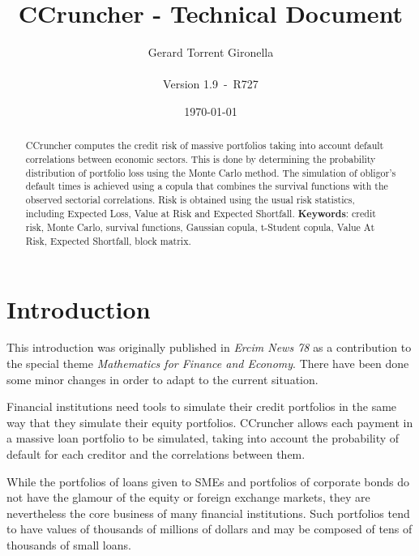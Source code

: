 \documentclass[a4paper,12pt,final]{article}
\def\numversion{1.9}
\def\svnversion{R727}
\begin{document}
\title{CCruncher - Technical Document}
\author{Gerard Torrent Gironella\\\\Version \numversion\ -\ \svnversion}
\date{\today}
\maketitle


\begin{abstract}
CCruncher computes the credit risk of massive portfolios 
taking into account default correlations between economic sectors. This is done 
by determining the probability distribution of portfolio loss using the Monte 
Carlo method. The simulation of obligor's default times is achieved
using a copula that combines the survival functions with the observed
sectorial correlations. Risk is obtained using the usual risk statistics, 
including Expected Loss, Value at Risk and Expected Shortfall.
\newline
\newline
\textbf{Keywords}: credit risk, Monte Carlo, survival functions, Gaussian copula, 
t-Student copula, Value At Risk, Expected Shortfall, block matrix.
\end{abstract}
\newpage


\tableofcontents
\newpage


\section{Introduction}

This introduction was originally published in \emph{Ercim News 78} \cite{ccruncher:ercim78}
as a contribution to the special theme \emph{Mathematics for Finance and Economy}.
There have been done some minor changes in order to adapt to the current situation.
\newline

Financial institutions need tools to simulate their credit portfolios in the same 
way that they simulate their equity portfolios. CCruncher allows each payment
in a massive loan portfolio to be simulated, taking into account the probability 
of default for each creditor and the correlations between them.
\newline

While the portfolios of loans given to SMEs and portfolios of corporate bonds do 
not have the glamour of the equity or foreign exchange markets, they are nevertheless 
the core business of many financial institutions. Such portfolios tend to have values 
of thousands of millions of dollars and may be composed of tens of thousands of small 
loans.
\newline
\end{document}
